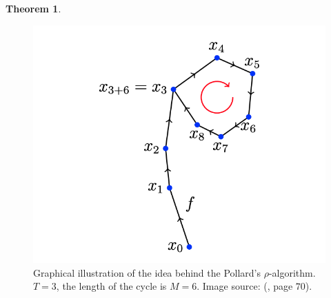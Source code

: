 \documentclass[thesis=M,english]{FITthesis}[2012/10/20]
\theoremstyle{remark}
\theoremstyle{definition}
\newtheorem{theorem}{Theorem}[section]
\begin{document}
\begin{theorem}
 \begin{figure}[h]
 \centering
 \hspace*{-1cm}
 	\includegraphics[width=1\textwidth]{rho.png}
 	\caption[Graphical illustration of the Pollard's $\rho$ collision idea]{Graphical illustration of the idea behind the Pollard's $\rho$-algorithm. $T = 3$, the length of the cycle is $M = 6$. Image source: (\cite{mky}, page $70$).}
 	\label{rho}
 \end{figure}
 \end{theorem}
\end{document}
